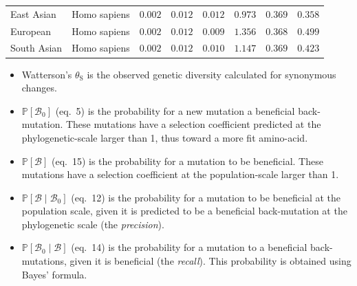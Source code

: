 \documentclass{article}
\newcommand{\proba}{\mathbb{P}}
\newcommand{\SphyBen}{\mathcal{B}_0}
\newcommand{\given}{\mid}
\newcommand{\SpopBen}{\mathcal{B}}
\newcommand{\thetaSyn}{\theta_{\text{S}}}
\begin{document}
\begin{center}
\begin{longtable*}{|l|l|r|r|r|r|r|r|}
            East Asian &        Homo sapiens &               $ 0.002$ &              $ 0.012$ &              $ 0.012$ &                                          $ 0.973$ &                         $ 0.369$ &                      $ 0.358$ \\
            European &        Homo sapiens &               $ 0.002$ &              $ 0.012$ &              $ 0.009$ &                                          $ 1.356$ &                         $ 0.368$ &                      $ 0.499$ \\
            South Asian &        Homo sapiens &               $ 0.002$ &              $ 0.012$ &              $ 0.010$ &                                          $ 1.147$ &                         $ 0.369$ &                      $ 0.423$ \\
        \end{longtable*}
    \end{center}
    \begin{itemize}
        \item Watterson's $\thetaSyn$ is the observed genetic diversity calculated for synonymous changes.
        \item $\proba [ \SphyBen ]$ (eq.~5) is the probability for a new mutation a beneficial back-mutation.
        These mutations have a selection coefficient predicted at the phylogenetic-scale larger than 1, thus toward a more fit amino-acid.
        \item $\proba [ \SpopBen ]$ (eq.~15) is the probability for a mutation to be beneficial.
        These mutations have a selection coefficient at the population-scale larger than 1.
        \item $\proba [ \SpopBen \given \SphyBen]$ (eq.~12) is the probability for a mutation to be beneficial at the population scale, given it is predicted to be a beneficial back-mutation at the phylogenetic scale (the \textit{precision}).
        \item $\proba [ \SphyBen \given \SpopBen]$ (eq.~14) is the probability for a mutation to a beneficial back-mutations, given it is beneficial (the \textit{recall}).
        This probability is obtained using Bayes' formula.
    \end{itemize}
    \newpage
\end{document}
